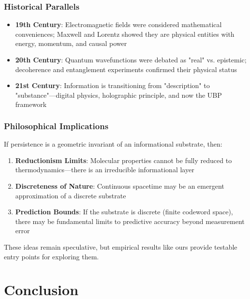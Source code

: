\documentclass[11pt,letterpaper]{article}
\begin{document}
\subsubsection{Historical Parallels}

\begin{itemize}
    \item \textbf{19th Century}: Electromagnetic fields were considered mathematical conveniences; Maxwell and Lorentz showed they are physical entities with energy, momentum, and causal power
    \item \textbf{20th Century}: Quantum wavefunctions were debated as "real" vs. epistemic; decoherence and entanglement experiments confirmed their physical status
    \item \textbf{21st Century}: Information is transitioning from "description" to "substance"—digital physics, holographic principle, and now the UBP framework
\end{itemize}

\subsubsection{Philosophical Implications}

If persistence is a geometric invariant of an informational substrate, then:
\begin{enumerate}
    \item \textbf{Reductionism Limits}: Molecular properties cannot be fully reduced to thermodynamics—there is an irreducible informational layer
    \item \textbf{Discreteness of Nature}: Continuous spacetime may be an emergent approximation of a discrete substrate
    \item \textbf{Prediction Bounds}: If the substrate is discrete (finite codeword space), there may be fundamental limits to predictive accuracy beyond measurement error
\end{enumerate}

These ideas remain speculative, but empirical results like ours provide testable entry points for exploring them.

\section{Conclusion}
\end{document}
